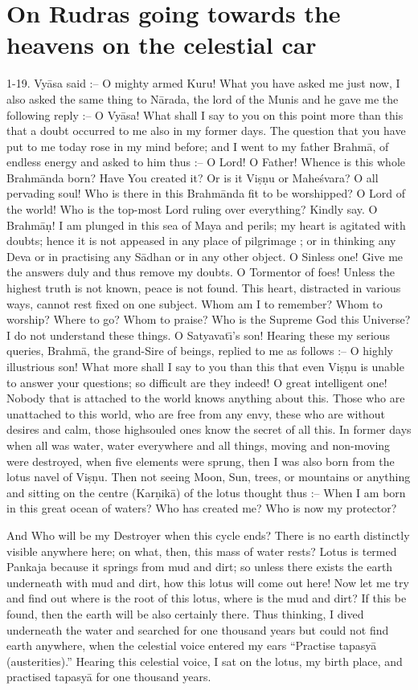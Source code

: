 \chapter{On Rudras going towards the heavens on the celestial car}

1-19. Vy\=asa said :-- O mighty armed Kuru! What you have asked me just now, I also asked the same thing to N\=arada, the lord of the Munis and he gave me the following reply :-- O Vy\=asa! What shall I say to you on this point more than this that a doubt occurred to me also in my former days. The question that you have put to me today rose in my mind before; and I went to my father Brahm\=a, of endless energy and asked to him thus :-- O Lord! O Father! Whence is this whole Brahm\=anda born? Have You created it? Or is it Vi\d{s}\d{n}u or Mahe\'svara? O all pervading soul! Who is there in this Brahm\=anda fit to be worshipped? O Lord of the world! Who is the top-most Lord ruling over everything? Kindly say. O Brahm\=a\d{n}! I am plunged in this sea of Maya and perils; my heart is agitated with doubts; hence it is not appeased in any place of pilgrimage ; or in thinking any Deva or in practising any S\=adhan or in any other object. O Sinless one! Give me the answers duly and thus remove my doubts. O Tormentor of foes! Unless the highest truth is not known, peace is not found. This heart, distracted in various ways, cannot rest fixed on one subject. Whom am I to remember? Whom to worship? Where to go? Whom to praise? Who is the Supreme God this Universe? I do not understand these things. O Satyavat\={\i}'s son! Hearing these my serious queries, Brahm\=a, the grand-Sire of beings, replied to me as follows :-- O highly illustrious son! What more shall I say to you than this that even Vi\d{s}\d{n}u is unable to answer your questions; so difficult are they indeed! O great intelligent one! Nobody that is attached to the world knows anything about this. Those who are unattached to this world, who are free from any envy, these who are without desires and calm, those highsouled ones know the secret of all this. In former days when all was water, water everywhere and all things, moving and non-moving were destroyed, when five elements were sprung, then I was also born from the lotus navel of Vi\d{s}\d{n}u. Then not seeing Moon, Sun, trees, or mountains or anything and sitting on the centre (Kar\d{n}ik\=a) of the lotus thought thus :-- When I am born in this great ocean of waters? Who has created me? Who is now my protector?

And Who will be my Destroyer when this cycle ends? There is no earth distinctly visible anywhere here; on what, then, this mass of water rests? Lotus is termed Pankaja because it springs from mud and dirt; so unless there exists the earth underneath with mud and dirt, how this lotus will come out here! Now let me try and find out where is the root of this lotus, where is the mud and dirt? If this be found, then the earth will be also certainly there. Thus thinking, I dived underneath the water and searched for one thousand years but could not find earth anywhere, when the celestial voice entered my ears ``Practise tapasy\=a (austerities).'' Hearing this celestial voice, I sat on the lotus, my birth place, and practised tapasy\=a for one thousand years.

